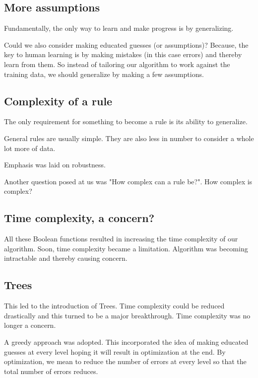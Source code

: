 \documentclass[a4paper]{article}
\begin{document}
\subsection{More assumptions}

Fundamentally, the only way to learn and make progress is by generalizing.

Could we also consider making educated guesses (or assumptions)? Because, the key to human learning is by making mistakes (in this case errors) and thereby learn from them. So instead of tailoring our algorithm to work against the training data, we should generalize by making a few assumptions.

\subsection{Complexity of a rule}

The only requirement for something to become a rule is its ability to generalize.

General rules are usually simple. They are also less in number to consider a whole lot more of data.

Emphasis was laid on robustness. 

Another question posed at us was "How complex can a rule be?". How complex is complex?

\subsection{Time complexity, a concern?}

All these Boolean functions resulted in increasing the time complexity of our algorithm. Soon, time complexity became a limitation. Algorithm was becoming intractable and thereby causing concern.

\subsection{Trees}

This led to the introduction of Trees. Time complexity could be reduced drastically and this turned to be a major breakthrough. Time complexity was no longer a concern. 

A greedy approach was adopted. This incorporated the idea of making educated guesses at every level hoping it will result in optimization at the end. By optimization, we mean to reduce the number of errors at every level so that the total number of errors reduces. 
\end{document}
